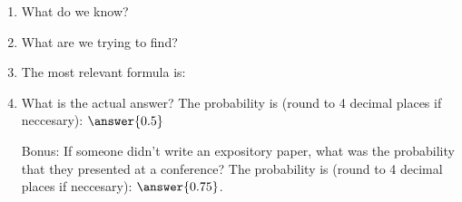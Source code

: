 \documentclass{ximera}
\begin{document}
 \begin{enumerate}
\item What do we know?

\begin{selectAll}
\end{selectAll}

\item What are we trying to find?

\begin{multipleChoice}




\end{multipleChoice}

\item The most relevant formula is:

\begin{multipleChoice}
\end{multipleChoice}

\item What is the actual answer?  The probability is (round to 4 decimal places if neccesary): $\answer{0.5}$

\item[Bonus:] If someone didn't write an expository paper, what was the probability that they presented at a conference?  The probability is (round to 4 decimal places if neccesary): $\answer{0.75}$.

\end{enumerate}

 
 
 
 
      
\end{document}
